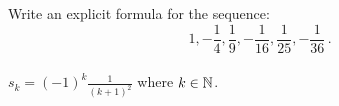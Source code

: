\guard




\begin{exmp}
\label{exmp:findExplicitFormulaOfSequence}
  Write an explicit formula for the sequence: \[ 1,-\frac{1}{4},\frac{1}{9},-\frac{1}{16},\frac{1}{25},-\frac{1}{36}\,.\]\\
  $s_k = (-1)^{k}\frac{1}{(k+1)^2}$ where $k\in\mathbb{N}$.
\end{exmp}
